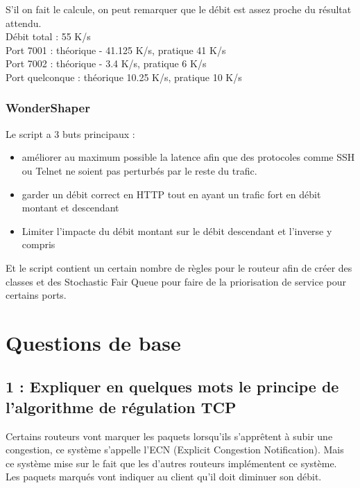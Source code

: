 \documentclass{article}
\begin{document}
S'il on fait le calcule, on peut remarquer que le débit est assez proche du résultat attendu. \\

Débit total : 55 K/s\\
Port 7001 : théorique - 41.125 K/s, pratique 41 K/s\\
Port 7002 : théorique - 3.4 K/s, pratique 6 K/s\\
Port quelconque : théorique 10.25 K/s, pratique 10 K/s

\subsubsection{WonderShaper}

Le script a 3 buts principaux : \\

\begin{itemize}
	\item améliorer au maximum possible la latence afin que des protocoles comme SSH ou Telnet ne soient pas perturbés par le reste du trafic.
	\item garder un débit correct en HTTP tout en ayant un trafic fort en débit montant et descendant
	\item Limiter l'impacte du débit montant sur le débit descendant et l'inverse y compris
\end{itemize}

Et le script contient un certain nombre de règles pour le routeur afin de créer des classes et des Stochastic Fair Queue pour faire de la priorisation de service pour certains ports.

\section{Questions de base}

\subsection*{1 : Expliquer en quelques mots le principe de l'algorithme de régulation TCP}

Certains routeurs vont marquer les paquets lorsqu'ils s'apprêtent à subir une congestion, ce système s'appelle l'ECN (Explicit Congestion Notification). Mais ce système mise sur le fait que les d'autres routeurs implémentent ce système. \cite{cours}\\

Les paquets marqués vont indiquer au client qu'il doit diminuer son débit.
\end{document}
